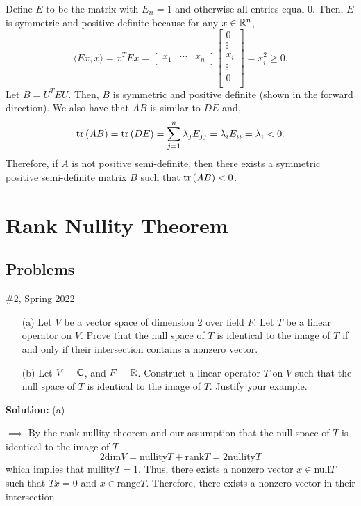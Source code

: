 \documentclass{article}
\begin{document}
Define $E$ to be the matrix with $E_{ii} = 1$ and otherwise all entries equal 0. Then, $E$ is symmetric and positive definite because for any $x\in\mathbb R^n$, 
	\[ \langle Ex, x \rangle = x^T Ex = 
		\begin{bmatrix} 
			x_1 & \cdots & x_n
		\end{bmatrix}
		\begin{bmatrix}
			0\\
			\vdots\\
			x_i\\
			\vdots\\
			0\\
		\end{bmatrix}
		= x_i^2 \geq 0.\]
Let $B = U^T E U$. Then, $B$ is symmetric and positive definite (shown in the forward direction). We also have that $AB$ is similar to $DE$ and,
	\[\text{tr}\left({AB}\right) = \text{tr}\left({DE}\right) = \sum_{j=1}^n \lambda_j E_{jj} = \lambda_i E_{ii} = \lambda_i < 0.\]
Therefore, if $A$ is not positive semi-definite, then there exists a symmetric positive semi-definite matrix $B$ such that $\text{tr}\left({AB}\right) < 0$.

\break 

\section{Rank Nullity Theorem}

\subsection{Problems}

\begin{problem}{\#2, Spring 2022}\;
	\begin{enumerate}
		\item[(a)] Let $V$ be a vector space of dimension 2 over field $F$. Let $T$ be a linear operator on $V$. Prove that the null space of $T$ is identical
				to the image of $T$ if and only if their intersection contains a nonzero vector. 
		\item[(b)] Let $V = \mathbb C$, and $F = \mathbb R$. Construct a linear operator $T$ on $V$ such that the null space of $T$ is identical to the image of $T$.
				Justify your example.
	\end{enumerate}
\end{problem}


\textbf{Solution:} (a)

	$\implies$ By the rank-nullity theorem and our assumption that the null space of $T$ is identical to the image of $T$ 
		\[ 2 \text{dim} V = \text{nullity} T + \text{rank} T = 2 \text{nullity} T\]
		which implies that nullity$T = 1$. Thus, there exists a nonzero vector $x\in$null$T$ such that $Tx = 0$ and $x\in$range$T$. Therefore, there exists
		a nonzero vector in their intersection.
		
\end{document}
